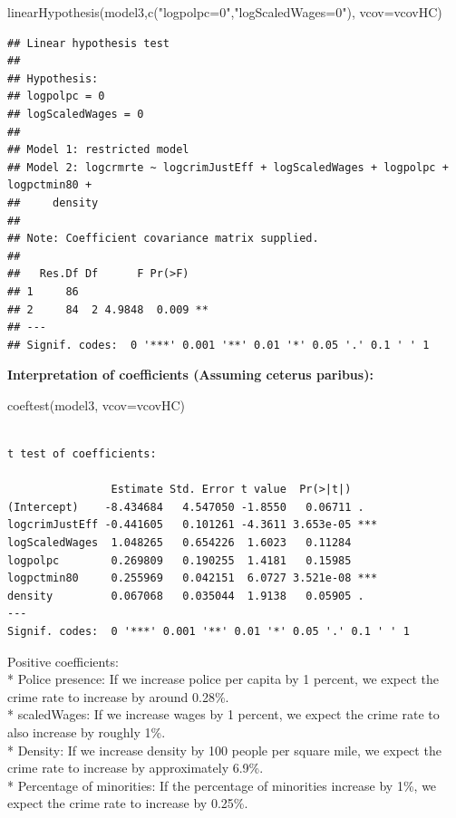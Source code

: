 \documentclass[]{article}
\newenvironment{Shaded}{}{}
\newcommand{\DataTypeTok}[1]{#1}
\newcommand{\KeywordTok}[1]{\textcolor[rgb]{0.00,0.00,1.00}{#1}}
\newcommand{\NormalTok}[1]{#1}
\newcommand{\StringTok}[1]{\textcolor[rgb]{0.00,0.50,0.50}{#1}}
\begin{document}
\begin{Shaded}
\begin{Highlighting}[]
\KeywordTok{linearHypothesis}\NormalTok{(model3,}\KeywordTok{c}\NormalTok{(}\StringTok{"logpolpc=0"}\NormalTok{,}\StringTok{"logScaledWages=0"}\NormalTok{), }\DataTypeTok{vcov=}\NormalTok{vcovHC)}
\end{Highlighting}
\end{Shaded}

\begin{verbatim}
## Linear hypothesis test
## 
## Hypothesis:
## logpolpc = 0
## logScaledWages = 0
## 
## Model 1: restricted model
## Model 2: logcrmrte ~ logcrimJustEff + logScaledWages + logpolpc + logpctmin80 + 
##     density
## 
## Note: Coefficient covariance matrix supplied.
## 
##   Res.Df Df      F Pr(>F)   
## 1     86                    
## 2     84  2 4.9848  0.009 **
## ---
## Signif. codes:  0 '***' 0.001 '**' 0.01 '*' 0.05 '.' 0.1 ' ' 1
\end{verbatim}

\textbf{Interpretation of coefficients (Assuming ceterus paribus):}

\begin{Shaded}
\begin{Highlighting}[]
\KeywordTok{coeftest}\NormalTok{(model3, }\DataTypeTok{vcov=}\NormalTok{vcovHC)}
\end{Highlighting}
\end{Shaded}

\begin{verbatim}

t test of coefficients:

                Estimate Std. Error t value  Pr(>|t|)    
(Intercept)    -8.434684   4.547050 -1.8550   0.06711 .  
logcrimJustEff -0.441605   0.101261 -4.3611 3.653e-05 ***
logScaledWages  1.048265   0.654226  1.6023   0.11284    
logpolpc        0.269809   0.190255  1.4181   0.15985    
logpctmin80     0.255969   0.042151  6.0727 3.521e-08 ***
density         0.067068   0.035044  1.9138   0.05905 .  
---
Signif. codes:  0 '***' 0.001 '**' 0.01 '*' 0.05 '.' 0.1 ' ' 1
\end{verbatim}

Positive coefficients:\\
* Police presence: If we increase police per capita by 1 percent, we
expect the crime rate to increase by around 0.28\%.\\
* scaledWages: If we increase wages by 1 percent, we expect the crime
rate to also increase by roughly 1\%.\\
* Density: If we increase density by 100 people per square mile, we
expect the crime rate to increase by approximately 6.9\%.\\
* Percentage of minorities: If the percentage of minorities increase by
1\%, we expect the crime rate to increase by 0.25\%.
\end{document}
